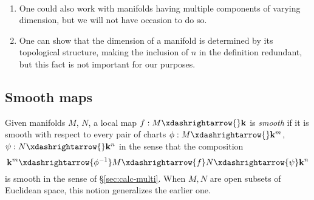 \documentclass[reqno]{amsart} 
\begin{document}
\begin{remark}
~
  \begin{enumerate}
  \item One could also work with manifolds
    having multiple components of varying dimension,
    but we will not have occasion to do so.
  \item One can show that the dimension of a manifold is determined by its topological structure,
    making the inclusion of $n$ in the definition redundant, but
    this fact
    is not important for our purposes.
  \end{enumerate}
\end{remark}

\subsection{Smooth maps}
\label{sec:org92b178d}
Given manifolds $M$, $N$, a local map
$f : M \xdashrightarrow{} \mathbf{k}$ is \emph{smooth} if it is
smooth with respect to every pair of charts
$\phi : M \xdashrightarrow{} \mathbf{k} ^m$,
$\psi : N \xdashrightarrow{} \mathbf{k} ^n$ in the sense that
the composition
\begin{equation*}
\mathbf{k}^m \xdashrightarrow{\phi^{-1}}
M
\xdashrightarrow{f}
N
\xdashrightarrow{\psi}
\mathbf{k}^n
\end{equation*}
is smooth in the sense of \S\ref{sec:calc-multi}.
When $M, N$ are open subsets of Euclidean space,
this notion generalizes the earlier one.
\end{document}
